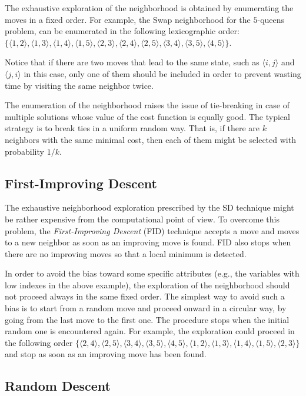 The exhaustive exploration of the neighborhood is obtained by
enumerating the moves in a fixed order.  For example, the
\textsf{Swap} neighborhood for the $5$-queens problem, can be
enumerated in the following lexicographic order: $\{\langle 1,2\rangle, \langle
1,3\rangle, \langle 1,4\rangle, \langle 1,5\rangle, \langle
2,3\rangle, \langle 2,4\rangle, \langle 2,5\rangle, \langle
3,4\rangle, \langle 3,5\rangle, \langle 4,5\rangle\}$.

Notice that if there are two moves that lead to the same state, such as $\langle i,j\rangle$ and $\langle j,i\rangle$ in this case, only one of them should be included in order to prevent wasting time by visiting the same neighbor twice.

The enumeration of the neighborhood raises the issue of tie-breaking
in case of multiple solutions whose value of the cost function is equally good. 
The typical strategy is
to break ties in a uniform random way. That is, if there are $k$
neighbors with the same minimal cost, then each of them might be selected with
probability $1/k$.

\subsection{First-Improving Descent}


The exhaustive neighborhood exploration prescribed by the SD technique might be
rather expensive from the computational point of view. To overcome
this problem, the \emph{First-Improving Descent} (FID) technique accepts a move and moves
to a new neighbor as soon as an improving move is found. FID also
stops when there are no improving moves so that a local minimum is
detected.

In order to avoid the bias toward some specific attributes (e.g., the variables
with low indexes in the above example), the exploration of the
neighborhood should not proceed always in the same fixed order. The
simplest way to avoid such a bias is to start from a random move and
proceed onward in a circular way, by going from the last move to the first one. The procedure stops when the initial
random one is encountered again. For example, the exploration could proceed in the
following order $\{\langle 2,4\rangle,
\langle 2,5\rangle, \langle 3,4\rangle, \langle 3,5\rangle, \langle
4,5\rangle, \langle 1,2\rangle, \langle 1,3\rangle, \langle
1,4\rangle, \langle 1,5\rangle, \langle 2,3\rangle\}$ and stop as soon as an improving move has been found.

\subsection{Random Descent}


